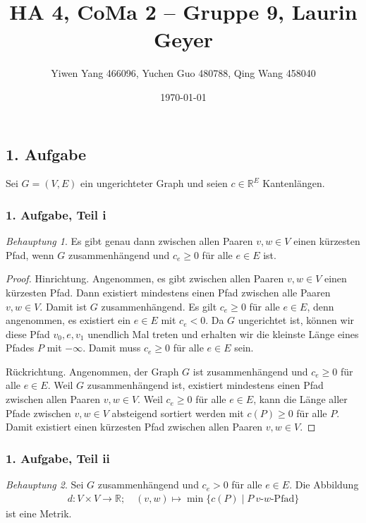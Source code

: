 \documentclass[draft,a5paper]{article}
\author{Yiwen Yang 466096, Yuchen Guo 480788, Qing Wang 458040}
\date{\today}
\title{HA 4, CoMa 2 -- Gruppe 9, Laurin Geyer}
\theoremstyle{remark}
\newtheorem*{beh}{Behauptung}
\begin{document}
\maketitle

\newpage

\subsection*{1. Aufgabe}

Sei \(G = (V, E)\) ein ungerichteter Graph und seien
\(c \in \mathbb{R}^{E}\) Kantenlängen.

\subsubsection*{1. Aufgabe, Teil i}

\begin{beh}
  Es gibt genau dann zwischen allen Paaren \(v, w \in V\) einen
  kürzesten Pfad, wenn \(G\) zusammenhängend und \(c_{e} \ge 0\) für
  alle \(e \in E\) ist.
\end{beh}

\begin{proof}
  Hinrichtung.  Angenommen, es gibt zwischen allen Paaren \(v, w \in V\)
  einen kürzesten Pfad.  Dann existiert mindestens einen Pfad zwischen
  alle Paaren \(v, w \in V\).  Damit ist \(G\) zusammenhängend.  Es gilt
  \(c_{e} \ge 0\) für alle \(e \in E\), denn angenommen, es existiert ein
  \(e \in E\) mit \(c_{e} < 0\).  Da \(G\) ungerichtet ist, können wir
  diese Pfad \(v_{0}, e, v_{1}\) unendlich Mal treten und erhalten wir
  die kleinste Länge eines Pfades \(P\) mit \(- \infty\).  Damit muss
  \(c_{e} \ge 0\) für alle \(e \in E\) sein.

  Rückrichtung.  Angenommen, der Graph \(G\) ist zusammenhängend und
  \(c_{e} \ge 0\) für alle \(e \in E\).  Weil \(G\) zusammenhängend ist,
  existiert mindestens einen Pfad zwischen allen Paaren
  \(v, w \in V\).  Weil \(c_{e} \ge 0\) für alle \(e \in E\), kann die Länge
  aller Pfade zwischen \(v, w \in V\) absteigend sortiert werden mit
  \(c(P) \ge 0\) für alle \(P\).  Damit existiert einen kürzesten Pfad
  zwischen allen Paaren \(v, w \in V\).
\end{proof}

\subsubsection*{1. Aufgabe, Teil ii}

\begin{beh}
  Sei \(G\) zusammenhängend und \(c_{e} > 0\) für alle \(e \in E\).  Die
  Abbildung
  \begin{align*}
    d\colon V \times V \to \mathbb{R}; \quad (v, w) \mapsto \min \{c(P) \mid P~\text{\(v\)-\(w\)-Pfad}\}
  \end{align*}
  ist eine Metrik.
\end{beh}
\end{document}

